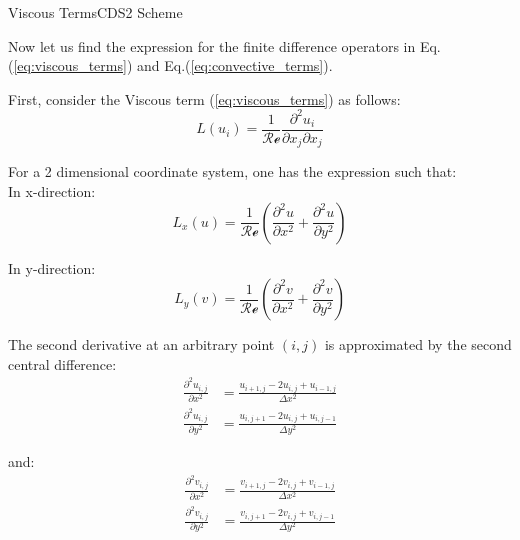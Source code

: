 \documentclass[aspectratio=169, sectionpages, codemintedoverleaf, bibref]{beamer}
\begin{document}
\begin{frame}{Viscous Terms}{CDS2 Scheme}

	Now let us find the expression for the finite difference operators in Eq.(\ref{eq:viscous_terms}) and Eq.(\ref{eq:convective_terms}).
 
    \prob First, consider the Viscous term (\ref{eq:viscous_terms}) as follows: \begin{equation}
        L (u_i) = \frac{1}{\mathcal{Re}} \frac{\partial^2 u_i}{\partial x_j \partial x_j}
    \end{equation}

    For a 2 dimensional coordinate system, one has the expression such that:
    \\
    In x-direction: \begin{equation}
        L_x (u) = \frac{1}{\mathcal{Re}} \left( \frac{\partial^2 u}{\partial x^2} + \frac{\partial^2 u}{\partial y^2} \right)
    \end{equation}

    In y-direction: \begin{equation}
        L_y (v) = \frac{1}{\mathcal{Re}} \left( \frac{\partial^2 v}{\partial x^2} + \frac{\partial^2 v}{\partial y^2} \right)
    \end{equation}

    \framebreak

    The second derivative at an arbitrary point $(i, j)$ is approximated by the second central difference: \begin{align}
        \frac{\partial^2 u_{i,j}}{\partial x^2} &= \frac{u_{i+1,j} - 2 u_{i,j} + u_{i-1,j}}{\Delta x^2} \\
        \frac{\partial^2 u_{i,j}}{\partial y^2} &= \frac{u_{i,j+1} - 2 u_{i,j} + u_{i,j-1}}{\Delta y^2}
    \end{align}

    and: \begin{align}
        \frac{\partial^2 v_{i,j}}{\partial x^2} &= \frac{v_{i+1,j} - 2 v_{i,j} + v_{i-1,j}}{\Delta x^2} \\
        \frac{\partial^2 v_{i,j}}{\partial y^2} &= \frac{v_{i,j+1} - 2 v_{i,j} + v_{i,j-1}}{\Delta y^2}
    \end{align}
        
\end{frame}
\end{document}
